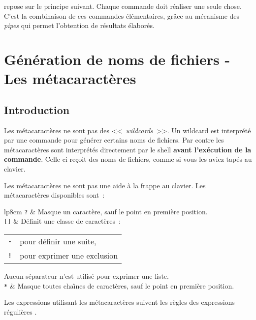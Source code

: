 {\Unix} repose sur le principe suivant. Chaque commande doit r{\'e}aliser
une seule chose. C'est la combinaison de ces commandes {\'e}l{\'e}mentaires,
gr{\^a}ce au m{\'e}canisme des \textsl{pipes} qui permet l'obtention de r{\'e}sultats
{\'e}labor{\'e}s.

\section{\label{basic-metacars}G{\'e}n{\'e}ration de noms de fichiers - Les m{\'e}tacaract{\`e}res}

\subsection{Introduction}

Les m{\'e}tacaract{\`e}res ne sont pas des
<<~\textsl{wildcards}~>>. Un wildcard est
interpr{\'e}t{\'e} par une commande pour g{\'e}n{\'e}rer certains noms
de fichiers. Par contre les m{\'e}tacaract{\`e}res sont
interpr{\'e}t{\'e}s directement par le shell \textbf{avant
l'ex{\'e}cution de la commande}. Celle-ci re\c{c}oit des noms de
fichiers, comme si vous les aviez tap{\'e}s au clavier.

Les m{\'e}tacaract{\`e}res ne sont pas une aide {\`a} la frappe au clavier.
Les m{\'e}tacaract{\`e}res disponibles sont~:~\\
\begin{tabular}{lp{8cm}}
	\texttt{?}		&
	Masque un caract{\`e}re, sauf le point en premi{\`e}re position.\\[0.5cm]
	\texttt{[]}		&
	D{\'e}finit une classe de caract{\`e}res~:
	\begin{tabular}{lp{5cm}}
		\index{-@\texttt{-}}\texttt{-}	& pour d{\'e}finir une suite,\\
		\index{!@\texttt{!}}\texttt{!}	& pour exprimer une exclusion
	\end{tabular}
	Aucun s{\'e}parateur n'est utilis{\'e} pour exprimer une liste.\\[0.5cm]
	\texttt{*}		&
	Masque toutes cha{\^\i}nes de caract{\`e}res, sauf le point en premi{\`e}re position.
\end{tabular}

\begin{remarque}
Les expressions utilisant les m{\'e}tacaract{\`e}res suivent les r{\`e}gles des expressions r{\'e}guli{\`e}res
{\Unix}.
\end{remarque}

